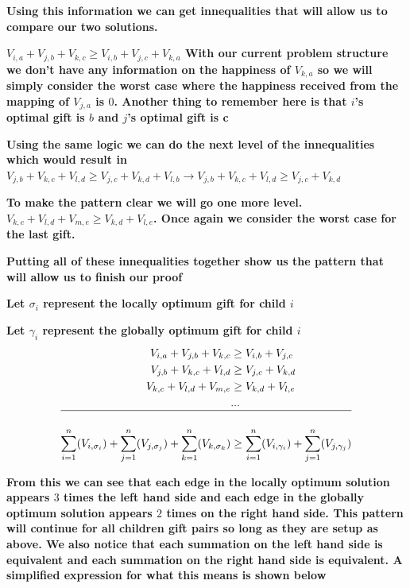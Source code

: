 \documentclass[addpoints]{exam}
\begin{document}
\begin{questions}
\textbf{Using this information we can get innequalities that will allow us to compare our two solutions.}

\textbf{$V_{i,a} + V_{j,b} + V_{k,c} \ge V_{i,b} + V_{j,c} + V_{k,a}$ With our current problem structure we don't have any information on the happiness of $V_{k,a}$ so we will simply consider the worst case where the happiness received from the mapping of $V_{j,a}$ is $0$. Another thing to remember here is that $i$'s optimal gift is $b$ and $j$'s optimal gift is c}

\textbf{Using the same logic we can do the next level of the innequalities which would result in $V_{j,b} + V_{k,c} + V_{l,d} \ge V_{j,c} + V_{k,d} + V_{l,b} \rightarrow V_{j,b} + V_{k,c} + V_{l,d} \ge V_{j,c} + V_{k,d}$}

\textbf{To make the pattern clear we will go one more level. $V_{k,c} + V_{l,d} + V_{m,e} \ge V_{k,d} + V_{l,e}$. Once again we consider the worst case for the last gift.}

\textbf{Putting all of these innequalities together show us the pattern that will allow us to finish our proof}

\textbf{Let $\sigma_i$ represent the locally optimum gift for child $i$}

\textbf{Let $\gamma_i$ represent the globally optimum gift for child $i$}
\begin{align}
    V_{i,a} + V_{j,b} + V_{k,c} &\ge V_{i,b} + V_{j,c} \\
    V_{j,b} + V_{k,c} + V_{l,d} &\ge V_{j,c} + V_{k,d} \\ 
    V_{k,c} + V_{l,d} + V_{m,e} &\ge V_{k,d} + V_{l,e} \\ 
    & ... \\
    \hline \\  
    \sum_{i=1}^{n}(V_{i,\sigma_i}) + \sum_{j=1}^{n}(V_{j,\sigma_j}) + \sum_{k=1}^{n}(V_{k,\sigma_k}) &\ge \sum_{i=1}^{n}(V_{i,\gamma_i}) + \sum_{j=1}^{n}(V_{j,\gamma_j}) 
\end{align}

\textbf{From this we can see that each edge in the locally optimum solution appears $3$ times the left hand side and each edge in the globally optimum solution appears $2$ times on the right hand side. This pattern will continue for all children gift pairs so long as they are setup as above. We also notice that each summation on the left hand side is equivalent and each summation on the right hand side is equivalent. A simplified expression for what this means is shown below}


\end{questions}
\end{document}
